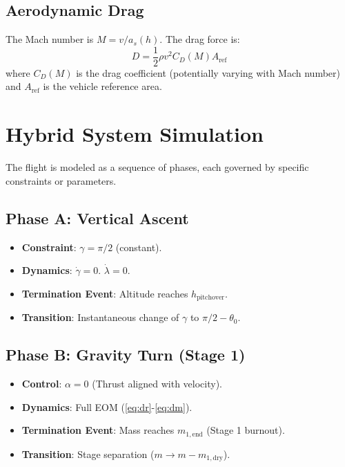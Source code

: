 \documentclass[11pt]{article}
\begin{document}
\subsection{Aerodynamic Drag}
The Mach number is $M = v / a_s(h)$. The drag force is:
\begin{equation}
    \label{eq:drag}
    D = \frac{1}{2} \rho v^2 C_D(M) A_{\text{ref}}
\end{equation}
where $C_D(M)$ is the drag coefficient (potentially varying with Mach number) and $A_{\text{ref}}$ is the vehicle reference area.

\section{Hybrid System Simulation}
\label{sec:hybrid}

The flight is modeled as a sequence of phases, each governed by specific constraints or parameters.

\subsection{Phase A: Vertical Ascent}
\begin{itemize}
    \item \textbf{Constraint}: $\gamma = \pi/2$ (constant).
    \item \textbf{Dynamics}: $\dot{\gamma} = 0$. $\dot{\lambda} = 0$.
    \item \textbf{Termination Event}: Altitude reaches $h_{\text{pitchover}}$.
    \item \textbf{Transition}: Instantaneous change of $\gamma$ to $\pi/2 - \theta_0$.
\end{itemize}

\subsection{Phase B: Gravity Turn (Stage 1)}
\begin{itemize}
    \item \textbf{Control}: $\alpha = 0$ (Thrust aligned with velocity).
    \item \textbf{Dynamics}: Full EOM (\ref{eq:dr}-\ref{eq:dm}).
    \item \textbf{Termination Event}: Mass reaches $m_{1,\text{end}}$ (Stage 1 burnout).
    \item \textbf{Transition}: Stage separation ($m \to m - m_{1,\text{dry}}$).
\end{itemize}
\end{document}
